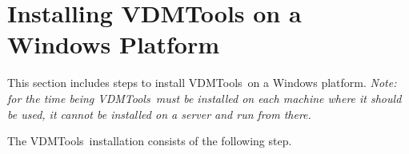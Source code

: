 \documentclass[\pformat,12pt]{article}
\newcommand{\Toolbox}{VDMTools}
\newcommand{\Toolbox}{VDMTools}
\newcommand{\Index}[1]{#1\index{#1}}
\begin{document}
\newpage
\section{Installing VDMTools on a Windows Platform}
\label{install-win32}



This section includes steps to install \Toolbox\ on a Windows
  platform. \emph{Note: for the time being \Toolbox\ must be 
  installed on each machine where it should be used, it cannot be
  installed on a server and run from there.}


The \Toolbox\ installation consists of the following step.
\end{document}
